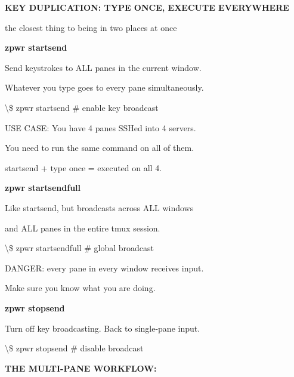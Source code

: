 \documentclass[11pt,a4paper,twoside]{book}
\begin{document}
\vspace{10pt}
{\large\bfseries\color{neoncyan} KEY DUPLICATION: TYPE ONCE, EXECUTE EVERYWHERE}\vspace{6pt}

the closest thing to being in two places at once


\vspace{12pt}
{\bfseries\color{neonyellow} zpwr startsend}\vspace{4pt}

Send keystrokes to ALL panes in the current window.

Whatever you type goes to every pane simultaneously.

\begin{codebox}
\textbackslash{}\$ zpwr startsend              \# enable key broadcast\\
\end{codebox}

USE CASE: You have 4 panes SSHed into 4 servers.

You need to run the same command on all of them.

startsend + type once = executed on all 4.


\vspace{12pt}
{\bfseries\color{neonyellow} zpwr startsendfull}\vspace{4pt}

Like startsend, but broadcasts across ALL windows

and ALL panes in the entire tmux session.

\begin{codebox}
\textbackslash{}\$ zpwr startsendfull          \# global broadcast\\
\end{codebox}

DANGER: every pane in every window receives input.

Make sure you know what you are doing.


\vspace{12pt}
{\bfseries\color{neonyellow} zpwr stopsend}\vspace{4pt}

Turn off key broadcasting. Back to single-pane input.

\begin{codebox}
\textbackslash{}\$ zpwr stopsend               \# disable broadcast\\
\end{codebox}


\vspace{12pt}
{\bfseries\color{neonyellow} THE MULTI-PANE WORKFLOW:}\vspace{4pt}
\end{document}
